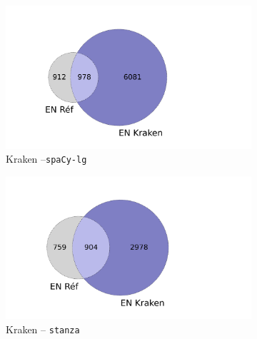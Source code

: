 \begin{figure}[h!]
    \begin{minipage}{7cm}
  \begin{subfigure}{1\textwidth}
  \includegraphics[width=1\textwidth]{IMAGES/INTERSECTIONS_GLOBALES/ELTeCFRA_Kraken_spacy-lg-concat_intersection.png} 
  \caption{Kraken --\texttt{spaCy-lg}}
  \label{fig:ELTeCFRA_Kraken_spacy-lg-concat_intersection}
  \end{subfigure}
  \end{minipage}
  \begin{minipage}{7cm}
  \begin{subfigure}{1\textwidth}
  \includegraphics[width=1\textwidth]{IMAGES/INTERSECTIONS_GLOBALES/ELTeCFRA_Kraken_stanza-concat_intersection.png}
  \caption{Kraken -- \texttt{stanza}}
  \end{subfigure}
    \end{minipage}
\begin{minipage}{7cm}
  \begin{subfigure}{1\textwidth}

\end{subfigure}
\end{minipage}
\end{figure}
